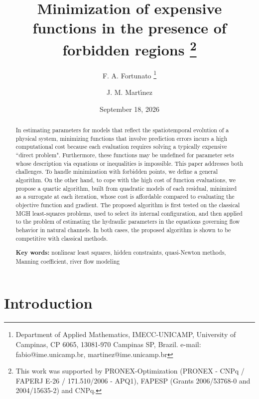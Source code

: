 \documentclass{article}
\begin{document}
 \title { Minimization of expensive functions in the presence of forbidden regions  
  \thanks{This work was supported by
    PRONEX-Optimization (PRONEX - CNPq / FAPERJ E-26 / 171.510/2006 -
    APQ1), FAPESP (Grants 2006/53768-0 and 2004/15635-2) and CNPq.}}

\author{
 F. A. Fortunato
\thanks{Department of Applied Mathematics, IMECC-UNICAMP, University
  of Campinas, CP 6065, 13081-970 Campinas SP, Brazil. e-mail:
fabio@ime.unicamp.br,   martinez@ime.unicamp.br}
\and
J. M. Mart\'{\i}nez \footnotemark[2]
}

\date{September 18, 2026}

\maketitle



\begin{abstract}


In estimating parameters for models that reflect the spatiotemporal evolution of a physical system,
 minimizing functions that involve prediction errors incurs a high computational cost because each evaluation requires
 solving a typically expensive ``direct problem". Furthermore, these functions may be undefined for parameter sets
whose description via equations or inequalities is impossible. This paper addresses both challenges. To handle minimization
 with forbidden points, we define a general algorithm. On the other hand, to cope with the high cost of function evaluations,
 we propose a quartic algorithm, built from quadratic models of each residual, minimized as a surrogate at each
 iteration, whose cost is affordable compared to evaluating the objective function and gradient. The proposed algorithm is first tested on the classical MGH least-squares
 problems, used to select its internal configuration, and then applied to the problem of estimating the hydraulic
 parameters in the equations governing flow behavior in natural channels. In both cases, the proposed algorithm
 is shown to be competitive with classical methods.




\noindent
{\bf Key words:} nonlinear least squares, hidden constraints, quasi-Newton methods, Manning coefficient, river flow modeling
\end{abstract}

\section{Introduction}
\end{document}
